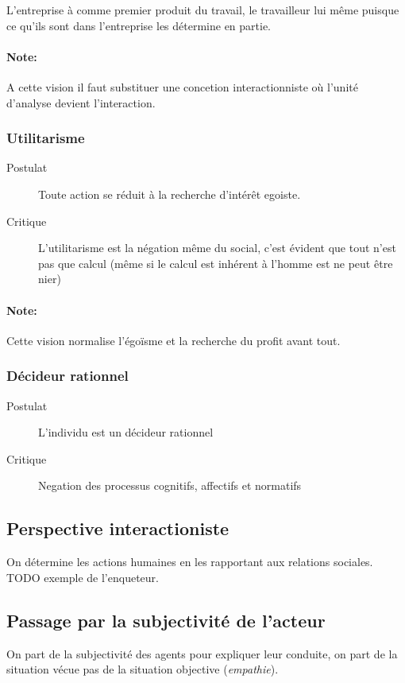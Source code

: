 \documentclass[11pt]{article} %
\begin{document}
L'entreprise à comme premier produit du travail, le travailleur lui même
puisque ce qu'ils sont dans l'entreprise les détermine en partie.

\paragraph{Note:} A cette vision il faut substituer une concetion
interactionniste où l'unité d'analyse devient l'interaction.

\subsubsection{Utilitarisme}

\begin{description}
    \item[Postulat] Toute action se réduit à la recherche d'intérêt egoiste.
    \item[Critique] L'utilitarisme est la négation même du social, c'est
        évident que tout n'est pas que calcul (même si le calcul est
        inhérent à l'homme est ne peut être nier)
\end{description}

\paragraph{Note: } Cette vision normalise l'égoïsme et la recherche du
profit avant tout.

\subsubsection{Décideur rationnel}

\begin{description}
    \item[Postulat] L'individu est un décideur rationnel
    \item[Critique] Negation des processus cognitifs, affectifs et normatifs
\end{description}


\subsection{Perspective interactioniste}
On détermine les actions humaines en les rapportant aux relations
sociales. TODO exemple de l'enqueteur.

\subsection{Passage par la subjectivité de l'acteur}
On part de la subjectivité des agents pour expliquer leur conduite,
on part de la situation vécue pas de la situation objective
(\textit{empathie}).
\end{document}
